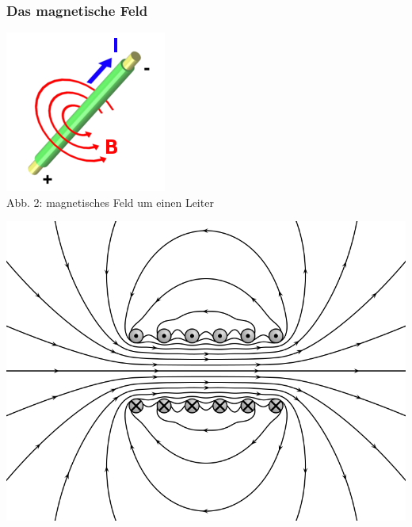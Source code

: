 \begin{frame}
    \frametitle{Das magnetische Feld}

    \begin{center}
        \begin{minipage}{0.45\textwidth}
            \begin{center}
                \includegraphics[width=\textwidth,height=.3\textheight,keepaspectratio]{e08/RechteHand.png}\\
                {\scriptsize Abb. 2: magnetisches Feld um einen Leiter\\
                }
            \end{center}
        \end{minipage}
        \begin{minipage}{0.45\textwidth}
            \begin{center}
                \includegraphics[width=\textwidth,height=.3\textheight,keepaspectratio]{e08/VFPt_cylindrical_coil_real.png}\\

\end{center}
\end{minipage}
\end{center}
\end{frame}
